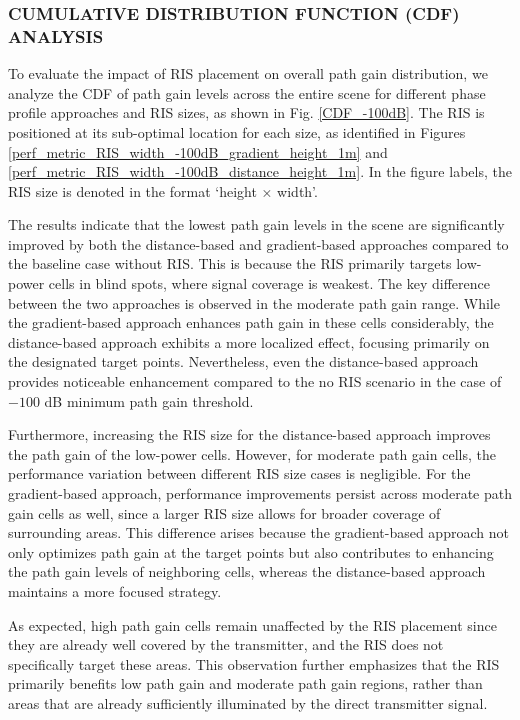 \documentclass{IEEEoj}
\begin{document}
\subsubsection{CUMULATIVE DISTRIBUTION FUNCTION (CDF) ANALYSIS}
To evaluate the impact of RIS placement on overall path gain distribution, we analyze the CDF of path gain levels across the entire scene for different phase profile approaches and RIS sizes, as shown in Fig. \ref{CDF_-100dB}. The RIS is positioned at its sub-optimal location for each size, as identified in Figures \ref{perf_metric_RIS_width_-100dB_gradient_height_1m} and \ref{perf_metric_RIS_width_-100dB_distance_height_1m}. In the figure labels, the RIS size is denoted in the format `height × width'.

The results indicate that the lowest path gain levels in the scene are significantly improved by both the distance-based and gradient-based approaches compared to the baseline case without RIS. This is because the RIS primarily targets low-power cells in blind spots, where signal coverage is weakest. The key difference between the two approaches is observed in the moderate path gain range. While the gradient-based approach enhances path gain in these cells considerably, the distance-based approach exhibits a more localized effect, focusing primarily on the designated target points. Nevertheless, even the distance-based approach provides noticeable enhancement compared to the no RIS scenario in the case of $-100$ dB minimum path gain threshold.

Furthermore, increasing the RIS size for the distance-based approach improves the path gain of the low-power cells. However, for moderate path gain cells, the performance variation between different RIS size cases is negligible. For the gradient-based approach, performance improvements persist across moderate path gain cells as well, since a larger RIS size allows for broader coverage of surrounding areas. This difference arises because the gradient-based approach not only optimizes path gain at the target points but also contributes to enhancing the path gain levels of neighboring cells, whereas the distance-based approach maintains a more focused strategy.

As expected, high path gain cells remain unaffected by the RIS placement since they are already well covered by the transmitter, and the RIS does not specifically target these areas. This observation further emphasizes that the RIS primarily benefits low path gain and moderate path gain regions, rather than areas that are already sufficiently illuminated by the direct transmitter signal.
\end{document}
